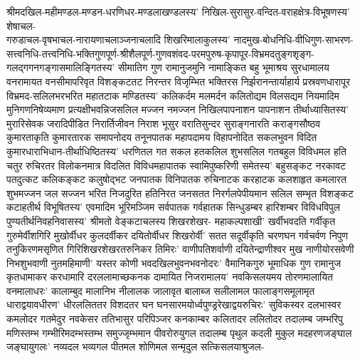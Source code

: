 
\begin{flushleft}
श्रीमदखिल-महीमण्डल-मण्डन-धरणिधर-मण्डलाखण्डलस्य'
निखिल-सुरासुर-वन्दित-वराहक्षेत्र-विभूषणस्य' शेषाचल-\\गरुडाचल-वृषभाचल-नारायणाचलाञ्जनाचलादि शिखरिमालाकुलस्य' नादमुख-बोधनिधि-वीधिगुण-साभरण-सत्त्वनिधि-तत्त्वनिधि-भक्तिगुणपूर्ण-श्रीशैलपूर्ण-गुणवशंवद-परमपुरुष-कृपापूर-विभ्रमदतुङ्गशृङ्ग-गलद्गगनगङ्गासमालिङ्गितस्य' सीमातिग गुण रामानुजमुनि नामाङ्कित बहु भूमाश्रय सुरधामालय
वनरामायत वनसीमापरिवृत विशङ्कटतट निरन्तर विजृम्भित भक्तिरस
निर्झरानन्तार्याहार्य प्रस्रवणधारापूर विभ्रमद-सलिल\-भरभरित महातटाक मण्डितस्य' कलिकर्दम मलमर्दन कलितोद्यम विलसद्यम
नियमादिम मुनिगणनिषेव्यमाण प्रत्यक्षीभवन्निजसलिल मज्जन
नमज्जन निखिलपापनाशन पापनाशन तीर्थाध्यासितस्य'
मुरारिसेवक जरादिपीडित निरार्तिजीवन निराश भूसुर वरातिसुन्दर सुराङ्गनारति कराङ्गसौष्ठव कुमारताकृति कुमारतारक समापनोदय तनूनपातक महापदामय विहापनोदित सकलभुवन विदित कुमारधाराभिधान-तीर्थाधिष्ठितस्य' धरणितल गत सकल हतकलिल शुभसलिल गतबहुल विविधमल हति चतुर रुचिरतर विलोकनमात्र विदलित विविधमहापातक स्वामिपुष्करिणी समेतस्य' बहुसङ्कट
नरकावट पतदुत्कट कलिकङ्कट कलुषोद्भट जनपातक विनिपातक
रुचिनाटक करहाटक कलशाहृत कमलारत शुभमज्जन जल सज्जन भरित निजदुरित हतिनिरत जनसतत निरर्गलपेपीयमान सलिल
सम्भृत विशङ्कट कटाहतीर्थ विभूषितस्य' एवमादिम भूरिमञ्जिम
सर्वपातक गर्वहातक सिन्धुडम्बर हारिशम्बर विविधविपुल पुण्यतीर्थनिवहनिवासस्य' श्रीमतो वेङ्कटाचलस्य शिखरशेखर-%
महाकल्पशाखी' खर्वीभवदति गर्वीकृत गुरुमेर्वीशगिरि मुखोर्वीधर कुलदर्वीकर दयितोर्वीधर शिखरोर्वी' सतत सदूर्वीकृति चरणघन गर्वचर्वण निपुण तनुकिरणमसृणित गिरिशिखरशेखरतरुनिकर
तिमिरः' वाणीपतिशर्वाणी दयितेन्द्राणीश्वर मुख नाणीयोरसवेणी निभशुभवाणी नुतमहिमाणी' यस्तर कोणी भवदखिलभुवनभवनोदरः' वैमानिकगुरु भूमाधिक गुण रामानुज कृतधामाकर करधामारि दरललामाच्छकनक दामायित निजरामालय' नवकिसलयमय तोरणमालायित वनमालाधरः' कालाम्बुद मालानिभ नीलालक
जालावृत बालाब्ज सलीलामल फालाङ्गसमूलामृत धाराद्वयावधीरण' धीरललिततर विशदतर घन घनसारमयोर्ध्वपुण्ड्ररेखाद्वयरुचिरः' सुविकस्वर दलभास्वर कमलोदर गतमेदुर नवकेसर ततिभासुर परिपिञ्जर कनकाम्बर कलितादर ललितोदर तदालम्ब जम्भरिपु मणिस्तम्भ गम्भीरिमदम्भस्तम्भ समुज्जृम्भमान पीवरोरुयुगल
तदालम्ब पृथुल कदली मुकुल मदहरणजङ्घाल जङ्घायुगलः'
नव्यदल भव्यगल पीतमल शोणिमल सन्मृदुल सत्किसलयाश्रुजल-%

\end{flushleft}
